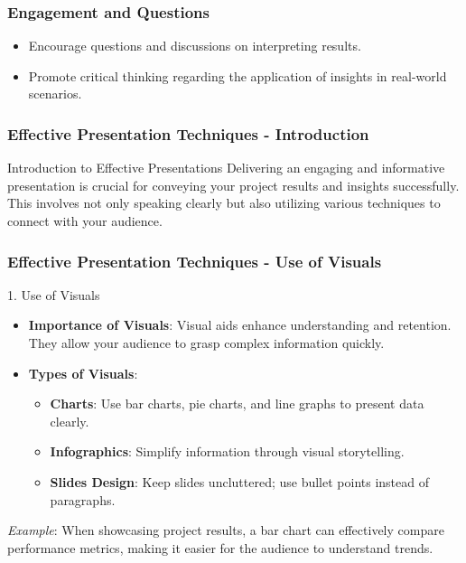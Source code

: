 \documentclass[aspectratio=169]{beamer}
\begin{document}
\begin{frame}
    \frametitle{Engagement and Questions}
    \begin{itemize}
        \item Encourage questions and discussions on interpreting results.
        \item Promote critical thinking regarding the application of insights in real-world scenarios.
    \end{itemize}
\end{frame}

\begin{frame}[fragile]
    \frametitle{Effective Presentation Techniques - Introduction}
    \begin{block}{Introduction to Effective Presentations}
        Delivering an engaging and informative presentation is crucial for conveying your project results and insights successfully. This involves not only speaking clearly but also utilizing various techniques to connect with your audience.
    \end{block}
\end{frame}

\begin{frame}[fragile]
    \frametitle{Effective Presentation Techniques - Use of Visuals}
    \begin{block}{1. Use of Visuals}
        \begin{itemize}
            \item \textbf{Importance of Visuals}: Visual aids enhance understanding and retention. They allow your audience to grasp complex information quickly.
            \item \textbf{Types of Visuals}:
            \begin{itemize}
                \item \textbf{Charts}: Use bar charts, pie charts, and line graphs to present data clearly.
                \item \textbf{Infographics}: Simplify information through visual storytelling.
                \item \textbf{Slides Design}: Keep slides uncluttered; use bullet points instead of paragraphs.
            \end{itemize}
        \end{itemize}
        \textit{Example}: When showcasing project results, a bar chart can effectively compare performance metrics, making it easier for the audience to understand trends.
    \end{block}
\end{frame}
\end{document}
